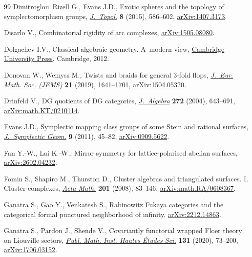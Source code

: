 \documentclass[pdftex]{sigma}
\theoremstyle{definition}
\numberwithin{equation}{section}
\begin{document}
\begin{thebibliography}{99}
Dimitroglou~Rizell G., Evans J.D., Exotic spheres and the topology of
 symplectomorphism groups,
 \href{https://doi.org/10.1112/jtopol/jtv007}{\textit{J.~Topol.}} \textbf{8}
 (2015), 586--602, \href{http://arxiv.org/abs/1407.3173}{arXiv:1407.3173}.

Disarlo V., Combinatorial rigidity of arc complexes,
 \href{http://arxiv.org/abs/1505.08080}{arXiv:1505.08080}.

Dolgachev I.V., Classical algebraic geometry. {A}~modern view,
 \href{https://doi.org/10.1017/CBO9781139084437}{Cambridge University Press},
 Cambridge, 2012.

Donovan W., Wemyss M., Twists and braids for general 3-fold flops,
 \href{https://doi.org/10.4171/JEMS/868}{\textit{J.~Eur. Math. Soc. (JEMS)}}
 \textbf{21} (2019), 1641--1701,
 \href{http://arxiv.org/abs/1504.05320}{arXiv:1504.05320}.

Drinfeld V., D{G} quotients of {DG} categories,
 \href{https://doi.org/10.1016/j.jalgebra.2003.05.001}{\textit{J.~Algebra}}
 \textbf{272} (2004), 643--691,
 \href{http://arxiv.org/abs/math.KT/0210114}{arXiv:math.KT/0210114}.

Evans J.D., Symplectic mapping class groups of some {S}tein and rational
 surfaces,
 \href{https://doi.org/10.4310/jsg.2011.v9.n1.a4}{\textit{J.~Symplectic
 Geom.}} \textbf{9} (2011), 45--82,
 \href{http://arxiv.org/abs/0909.5622}{arXiv:0909.5622}.

Fan Y.-W., Lai K.-W., Mirror symmetry for lattice-polarised abelian surfaces,
 \href{http://arxiv.org/abs/2602.04232}{arXiv:2602.04232}.

Fomin S., Shapiro M., Thurston D., Cluster algebras and triangulated surfaces.
 {I}. {C}luster complexes,
 \href{https://doi.org/10.1007/s11511-008-0030-7}{\textit{Acta Math.}}
 \textbf{201} (2008), 83--146,
 \href{http://arxiv.org/abs/math.RA/0608367}{arXiv:math.RA/0608367}.

Ganatra S., Gao Y., Venkatesh S., Rabinowitz {F}ukaya categories and the
 categorical formal punctured neighborhood of infinity,
 \href{http://arxiv.org/abs/2212.14863}{arXiv:2212.14863}.

Ganatra S., Pardon J., Shende V., Covariantly functorial wrapped {F}loer theory
 on {L}iouville sectors,
 \href{https://doi.org/10.1007/s10240-019-00112-x}{\textit{Publ. Math. Inst.
 Hautes \'{E}tudes Sci.}} \textbf{131} (2020), 73--200,
 \href{http://arxiv.org/abs/1706.03152}{arXiv:1706.03152}.


\end{thebibliography}
\end{document}
